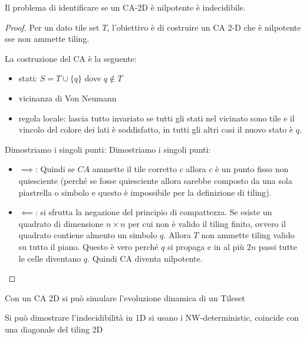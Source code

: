 \begin{teorema} 
    Il problema di identificare se un CA-2D è nilpotente è indecidibile.
    \begin{proof}
        Per un dato tile set $T$, l'obiettivo è di costruire un CA 2-D che è
        nilpotente sse non ammette tiling.

        La costruzione del CA è la seguente:
        \begin{itemize}
            \item stati: $S=T\cup \{q\}$ dove $q\not\in T$
            \item vicinanza di Von Neumann
            \item regola locale: lascia tutto invariato se tutti gli stati nel
                  vicinato sono tile e il vincolo del colore dei lati è soddisfatto, in
                  tutti gli altri casi il nuovo stato è $q$.
        \end{itemize}
        Dimostriamo i singoli punti:
        Dimostriamo i singoli punti:
        \begin{itemize}
            \item $\implies$:
                  Quindi se $CA$ ammette il tile corretto $c$ allora $c$ è un punto fisso
                  non quiesciente (perché se fosse quiesciente allora sarebbe composto
                  da una sola piastrella o simbolo e questo è impossibile per la definizione
                  di tiling).
            \item $\impliedby$: si sfrutta la negazione del principio di compattezza.
                  Se esiste un quadrato di dimensione $n\times n$ per cui non è valido
                  il tiling finito, ovvero il quadrato contiene almento un simbolo $q$.
                  Allora $T$ non ammette tiling valido su tutto il piano. Questo è vero
                  perché $q$ si propaga e in al più $2n$ passi tutte le celle diventano
                  $q$. Quindi CA diventa nilpotente.
        \end{itemize}
    \end{proof}
\end{teorema}

\begin{nota}
    Con un CA 2D si può simulare l'evoluzione dinamica di un Tileset
\end{nota}

Si può dimostrare l'indecidibilità in 1D si usano i NW-deterministic, coincide
con una diagonale del tiling 2D

